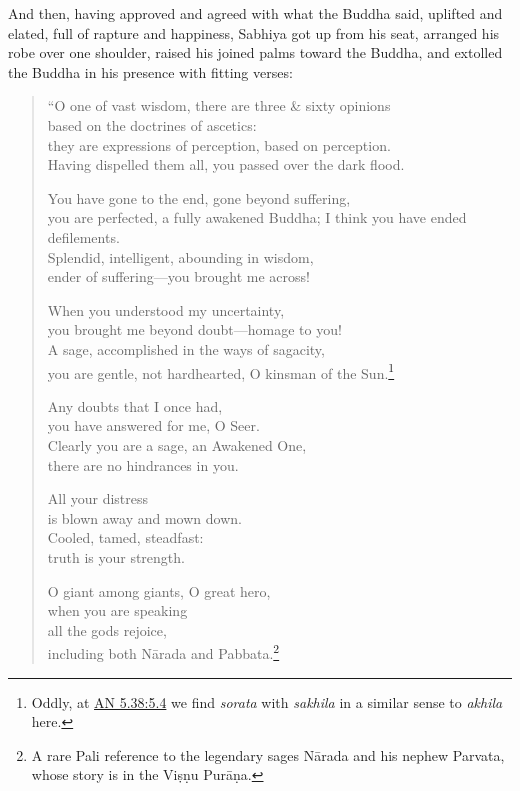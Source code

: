 \documentclass[12pt,openany]{book}%
\begin{document}
And then, having approved and agreed with what the Buddha said, uplifted and elated, full of rapture and happiness, Sabhiya got up from his seat, arranged his robe over one shoulder, raised his joined palms toward the Buddha, and extolled the Buddha in his presence with fitting verses: 

\begin{verse}%
“O one of vast wisdom, there are three \& sixty opinions \\
based on the doctrines of ascetics: \\
they are expressions of perception, based on perception. \\
Having dispelled them all, you passed over the dark flood. 

You have gone to the end, gone beyond suffering, \\
you are perfected, a fully awakened Buddha; I think you have ended defilements. \\
Splendid, intelligent, abounding in wisdom, \\
ender of suffering—you brought me across! 

When you understood my uncertainty, \\
you brought me beyond doubt—homage to you! \\
A sage, accomplished in the ways of sagacity, \\
you are gentle, not hardhearted, O kinsman of the Sun.\footnote{Oddly, at \href{https://suttacentral.net/an5.38/en/sujato\#5.4}{AN 5.38:5.4} we find \textit{sorata} with \textit{sakhila} in a similar sense to \textit{akhila} here. } 

Any doubts that I once had, \\
you have answered for me, O Seer. \\
Clearly you are a sage, an Awakened One, \\
there are no hindrances in you. 

All your distress \\
is blown away and mown down. \\
Cooled, tamed, steadfast: \\
truth is your strength. 

O giant among giants, O great hero, \\
when you are speaking \\
all the gods rejoice, \\
including both \textsanskrit{Nārada} and Pabbata.\footnote{A rare Pali reference to the legendary sages \textsanskrit{Nārada} and his nephew Parvata, whose story is in the \textsanskrit{Viṣṇu} \textsanskrit{Purāṇa}. } 


\end{verse}
\end{document}
